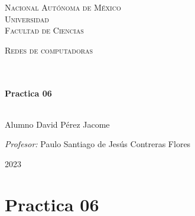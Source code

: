\documentclass[14pt]{book}
\begin{document}
\begin{center}
\begin{minipage}{0.48\textwidth}
\begin{flushright}
    \end{flushright}
  \end{minipage}
  \vspace*{-1.5cm}
  \textsc{\huge Nacional Autónoma de México \\ \vspace{-4px} Universidad }\\[2cm]
  \textsc{\LARGE Facultad de Ciencias}\\[1.5cm]
  \begin{minipage}{0.9\textwidth}
    \begin{center}
      \textsc{\LARGE Redes de computadoras}
    \end{center}
  \end{minipage}\\[0.5cm]
  \vspace*{1cm}
  \HRule \\[0.4cm]
  { \huge \bfseries Practica 06}\\[0.4cm]
  \HRule \\[1.5cm]
  \begin{minipage}{0.52\textwidth}
    \begin{flushleft} \large \small \vspace{-0.6cm} \vspace{-0.6cm}
      Alumno David Pérez Jacome \\
    \end{flushleft}
  \end{minipage}
  \begin{minipage}{0.46\textwidth}
    \vspace{-0.6cm}
    \begin{flushright} \large \small \emph{Profesor:}
      Paulo Santiago de Jesús Contreras Flores \\
    \end{flushright}
  \end{minipage}
  \vspace*{1cm}
  \vspace{2cm}
  \begin{center}
    {\large 2023}
  \end{center}
\end{center}
\newpage

{\color{blue} \section*{\textbf{Practica 06}}}
\vspace{1em}
\end{document}
